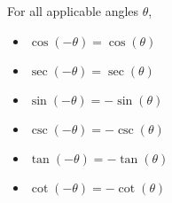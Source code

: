 \documentclass{ximera}
\begin{document}
\begin{callout} For all applicable angles $\theta$,
\begin{itemize}

\item  $\cos(-\theta) = \cos(\theta)$

\item  $\sec(-\theta) = \sec(\theta)$

\item  $\sin(-\theta) = -\sin(\theta)$

\item  $\csc(-\theta) = -\csc(\theta)$

\item  $\tan(-\theta) = -\tan(\theta)$

\item  $\cot(-\theta) = -\cot(\theta)$

\end{itemize}
\end{callout}




\end{document}
